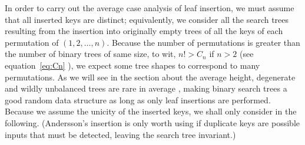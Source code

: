 
In order to carry out the average case analysis of leaf insertion, we
must assume that all inserted keys are distinct; equivalently, we
consider all the search trees resulting from the insertion into
originally empty trees of all the keys of each permutation of
\((1,2,\dots,n)\). Because the number of permutations is greater than
the number of binary trees of same size, to wit, \(n! > C_n\) if \(n >
2\) (see equation~\eqref{eq:Cn} ), we expect some tree
shapes to correspond to many permutations. As we will see in the
section about the average height, degenerate and wildly unbalanced
trees are rare in average \citep{Fill_1996}, making binary search
trees a good random data structure as long as only leaf insertions are
performed. Because we assume the unicity of the inserted keys, we
shall only consider  in the following. (Andersson's
insertion is only worth using if duplicate keys are possible inputs
that must be detected, leaving the search tree invariant.)

